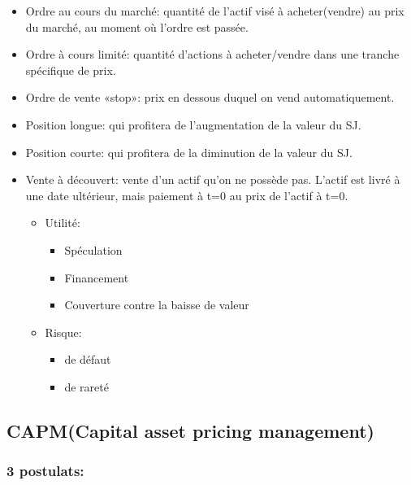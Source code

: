 \documentclass[]{book}
\providecommand{\tightlist}{%
  \setlength{\itemsep}{0pt}\setlength{\parskip}{0pt}}
\theoremstyle{definition}
\theoremstyle{definition}
\theoremstyle{definition}
\theoremstyle{remark}
\begin{document}
\begin{itemize}
\tightlist
\item
  Ordre au cours du marché: quantité de l'actif visé à acheter(vendre)
  au prix du marché, au moment où l'ordre est passée.
\item
  Ordre à cours limité: quantité d'actions à acheter/vendre dans une
  tranche spécifique de prix.
\item
  Ordre de vente «stop»: prix en dessous duquel on vend automatiquement.
\item
  Position longue: qui profitera de l'augmentation de la valeur du SJ.
\item
  Position courte: qui profitera de la diminution de la valeur du SJ.
\item
  Vente à découvert: vente d'un actif qu'on ne possède pas. L'actif est
  livré à une date ultérieur, mais paiement à t=0 au prix de l'actif à
  t=0.

  \begin{itemize}
  \tightlist
  \item
    Utilité:

    \begin{itemize}
    \tightlist
    \item
      Spéculation
    \item
      Financement
    \item
      Couverture contre la baisse de valeur
    \end{itemize}
  \item
    Risque:

    \begin{itemize}
    \tightlist
    \item
      de défaut
    \item
      de rareté
    \end{itemize}
  \end{itemize}
\end{itemize}

\subsection{CAPM(Capital asset pricing
management)}\label{capmcapital-asset-pricing-management}

\subsubsection*{3 postulats:}\label{postulats}
\end{document}
